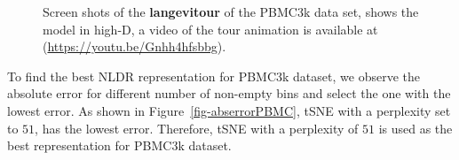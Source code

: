 \documentclass[
  12pt]{article}
\begin{document}
\begin{figure}[H]
\begin{minipage}{0.33\linewidth}
{}

\subcaption{\label{fig-pbmc1-sc2}}

\end{minipage}%
%
\begin{minipage}{0.33\linewidth}


\subcaption{\label{fig-pbmc1-sc3}}

\end{minipage}%

\caption{\label{fig-pbmc1-sc}Screen shots of the \textbf{langevitour} of
the PBMC3k data set, shows the model in high-D, a video of the tour
animation is available at (\url{https://youtu.be/Gnhh4hfsbbg}).}

\end{figure}%

To find the best NLDR representation for PBMC3k dataset, we observe the
absolute error for different number of non-empty bins and select the one
with the lowest error. As shown in Figure~\ref{fig-abserrorPBMC}, tSNE
with a perplexity set to \(51\), has the lowest error. Therefore, tSNE
with a perplexity of \(51\) is used as the best representation for
PBMC3k dataset.
\end{document}
